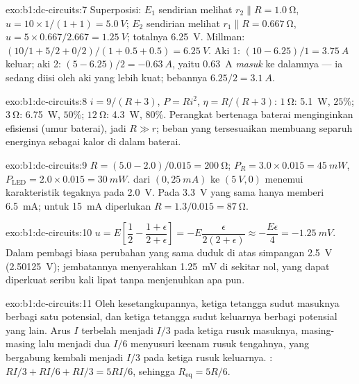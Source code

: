 \begin{solution}{exo:b1:dc-circuits:7}
Superposisi: $E_1$ sendirian melihat $r_2 \parallel R = \qty{1.0}{\ohm}$,
$u = 10 \times 1/(1 + 1) = \qty{5.0}{V}$; $E_2$ sendirian melihat $r_1 \parallel R
= \qty{0.667}{\ohm}$, $u = 5 \times 0.667/2.667 = \qty{1.25}{V}$; totalnya
\qty{6.25}{V}. Millman: $(10/1 + 5/2 + 0/2)/(1 + 0.5 + 0.5) = \qty{6.25}{V}$.
Aki 1: $(10 - 6.25)/1 = \qty{3.75}{A}$ keluar; aki 2: $(5 - 6.25)/2
= \qty{-0.63}{A}$, yaitu \qty{0.63}{A} \emph{masuk} ke dalamnya --- ia
sedang diisi oleh aki yang lebih kuat; bebannya $6.25/2 = \qty{3.1}{A}$.
\end{solution}

\begin{solution}{exo:b1:dc-circuits:8}
$i = 9/(R + 3)$, $P = Ri^2$, $\eta = R/(R + 3)$: $\qty{1}{\ohm}$:
\qty{5.1}{W}, $25\%$; $\qty{3}{\ohm}$: \qty{6.75}{W}, $50\%$;
$\qty{12}{\ohm}$: \qty{4.3}{W}, $80\%$. Perangkat bertenaga baterai
menginginkan efisiensi (umur baterai), jadi $R \gg r$; beban yang
tersesuaikan membuang separuh energinya sebagai kalor di dalam baterai.
\end{solution}

\begin{solution}{exo:b1:dc-circuits:9}
$R = (5.0 - 2.0)/0.015 = \qty{200}{\ohm}$; $P_R = 3.0 \times 0.015 =
\qty{45}{mW}$, $P_{\mathrm{LED}} = 2.0 \times 0.015 = \qty{30}{mW}$.  dari $(0, \qty{25}{mA})$ ke $(\qty{5}{V}, 0)$ menemui
karakteristik tegaknya pada \qty{2.0}{V}. Pada \qty{3.3}{V}  yang
sama hanya memberi \qty{6.5}{mA}; untuk \qty{15}{mA} diperlukan $R = 1.3/0.015 =
\qty{87}{\ohm}$.
\end{solution}

\begin{solution}{exo:b1:dc-circuits:10}
$u = E\left[\dfrac12 - \dfrac{1 + \epsilon}{2 + \epsilon}\right] =
-E\dfrac{\epsilon}{2(2 + \epsilon)} \approx -\dfrac{E\epsilon}{4} =
\qty{-1.25}{mV}$. Dalam pembagi biasa perubahan yang sama duduk di atas
simpangan \qty{2.5}{V} (\qty{2.50125}{V}); jembatannya menyerahkan
\qty{1.25}{mV} di sekitar nol, yang dapat diperkuat seribu kali lipat
tanpa menjenuhkan apa pun.
\end{solution}

\begin{solution}{exo:b1:dc-circuits:11}
Oleh kesetangkupannya, ketiga tetangga sudut masuknya berbagi satu
potensial, dan ketiga tetangga sudut keluarnya berbagi potensial yang
lain. Arus $I$ terbelah menjadi $I/3$ pada ketiga rusuk masuknya,
masing-masing lalu menjadi dua $I/6$ menyusuri keenam rusuk tengahnya,
yang bergabung kembali menjadi $I/3$ pada ketiga rusuk keluarnya.
: $RI/3 + RI/6 + RI/3 = 5RI/6$, sehingga $R_{\mathrm{eq}} = 5R/6$.
\end{solution}

